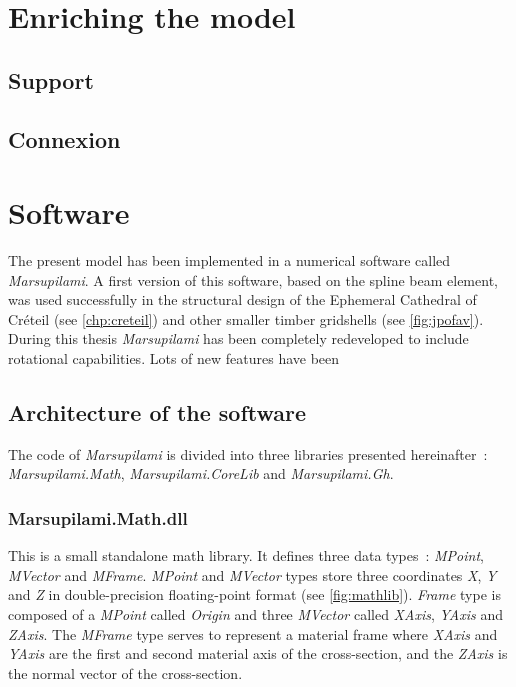 \section{Enriching the model}\label{sec:enriching}
\subsection{Support}
\subsection{Connexion}

\clearpage
\section{Software}\label{sec:software}
The present model has been implemented in a numerical software called \emph{Marsupilami}. A first version of this software, based on the  spline beam element, was used successfully in the structural design of the Ephemeral Cathedral of Créteil (see \cref{chp:creteil}) and other smaller timber gridshells (see \cref{fig:jpofav}). During this thesis \emph{Marsupilami} has been completely redeveloped to include rotational \dofs{} capabilities. Lots of new features have been 

\subsection{Architecture of the software}
The code of \emph{Marsupilami} is divided into three libraries presented hereinafter~: \textit{Marsupilami.Math}, \textit{Marsupilami.CoreLib} and \textit{Marsupilami.Gh}.

\subsubsection{Marsupilami.Math.dll}
This is a small standalone math library. It defines three data types~: \textit{MPoint}, \textit{MVector} and \textit{MFrame}. \textit{MPoint} and \textit{MVector} types store three coordinates \textit{X}, \textit{Y} and \textit{Z} in double-precision floating-point format (see \cref{fig:mathlib}). \textit{Frame} type is composed of a \textit{MPoint} called \textit{Origin} and three \textit{MVector} called \textit{XAxis}, \textit{YAxis} and \textit{ZAxis}. The \textit{MFrame} type serves to represent a material frame where \textit{XAxis} and \textit{YAxis} are the first and second material axis of the cross-section, and the \textit{ZAxis} is the normal vector of the cross-section.


